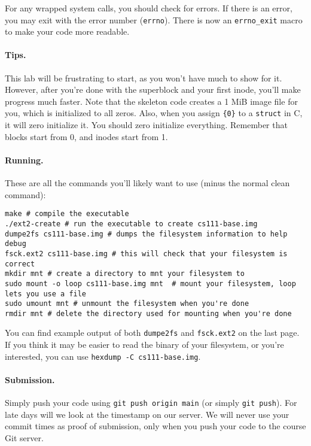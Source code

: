 For any wrapped system calls, you should check for errors.
If there is an error, you may exit with the error number (\texttt{errno}).
There is now an \texttt{errno\_exit} macro to make your code more readable.

\paragraph{Tips.}

This lab will be frustrating to start, as you won't have much to show for it.
However, after you're done with the superblock and your first inode, you'll
make progress much faster.
Note that the skeleton code creates a 1 MiB image file for you, which is
initialized to all zeros.
Also, when you assign \texttt{\{0\}} to a \texttt{struct} in C, it will
zero initialize it.
You should zero initialize everything.
Remember that blocks start from 0, and inodes start from 1.

\paragraph{Running.}

These are all the commands you'll likely want to use (minus the normal
clean command):

\begin{lstlisting}
make # compile the executable
./ext2-create # run the executable to create cs111-base.img
dumpe2fs cs111-base.img # dumps the filesystem information to help debug
fsck.ext2 cs111-base.img # this will check that your filesystem is correct
mkdir mnt # create a directory to mnt your filesystem to
sudo mount -o loop cs111-base.img mnt  # mount your filesystem, loop lets you use a file
sudo umount mnt # unmount the filesystem when you're done
rmdir mnt # delete the directory used for mounting when you're done
\end{lstlisting}

You can find example output of both \lstinline|dumpe2fs| and
\lstinline|fsck.ext2| on the last page.
If you think it may be easier to read the binary of your filesystem, or
you're interested, you can use \lstinline|hexdump -C cs111-base.img|.

\paragraph{Submission.}

Simply push your code using \lstinline|git push origin main| (or simply
\lstinline|git push|).
For late days will we look at the timestamp on our server.
We will never use your commit times as proof of submission, only when you
push your code to the course Git server.

